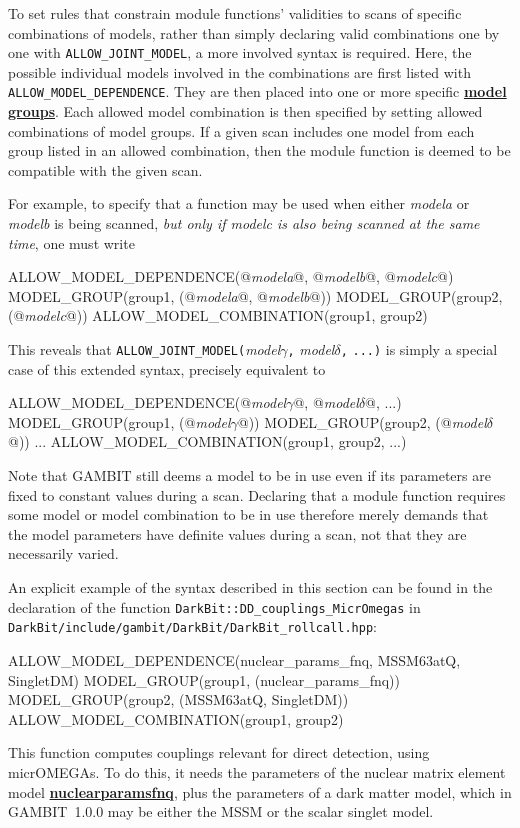 \documentclass[pdftex,twocolumn,epjc3_preprint,runningheads]{svjour3}
\renewcommand{\_}{\discretionary{\underscore}{}{\underscore}}
\newcommand\cpp[1]{{\lstinline!#1!}}  %
\newcommand\term[1]{{\lstset{style=terminal}\lstinline!#1!\lstset{style=cpp}}}
\newcommand{\doublecross}[2]{\hyperref[#2]{\textbf{#1}}}
\newcommand{\doublecrosssf}[2]{\hyperref[#2]{\textbf{\textsf{#1}}}}
\newcommand{\metavarf}[1]{\textit{\color{darkgreen}\footnotesize\textrm{#1}}}
\newcommand{\metavar}{\metavarf}
\newcommand{\gambit}{\textsf{GAMBIT}\xspace}
\newcommand{\GB}{\gambit}
\newcommand{\micromegas}{\textsf{micrOMEGAs}\xspace}
\begin{document}
To set rules that constrain module functions' validities to scans of specific combinations of models, rather than simply declaring valid combinations one by one with \lstinline|ALLOW_JOINT_MODEL|, a more involved syntax is required.  Here, the possible individual models involved in the combinations are first listed with \lstinline|ALLOW_MODEL_DEPENDENCE|.  They are then placed into one or more specific \doublecross{model groups}{model group}.  Each allowed model combination is then specified by setting allowed combinations of model groups.  If a given scan includes one model from each group listed in an allowed combination, then the module function is deemed to be compatible with the given scan.

For example, to specify that a function may be used when either \metavar{model\_a} or \metavar{model\_b} is being scanned, \textit{but only if \metavar{model\_c} is also being scanned at the same time}, one must write
\begin{lstcpp}
ALLOW_MODEL_DEPENDENCE(@\metavar{model\_a}@, @\metavar{model\_b}@, @\metavar{model\_c}@)
MODEL_GROUP(group1, (@\metavar{model\_a}@, @\metavar{model\_b}@))
MODEL_GROUP(group2, (@\metavar{model\_c}@))
ALLOW_MODEL_COMBINATION(group1, group2)
\end{lstcpp}
This reveals that \cpp{ALLOW_JOINT_MODEL(}\metavar{model\_$\gamma$}\cpp{,} \metavar{model\_$\delta$}\cpp{,} \cpp{...)} is simply a special case of this extended syntax, precisely equivalent to
\begin{lstcpp}
ALLOW_MODEL_DEPENDENCE(@\metavar{model\_$\gamma$}@, @\metavar{model\_$\delta$}@, ...)
MODEL_GROUP(group1, (@\metavar{model\_$\gamma$}@))
MODEL_GROUP(group2, (@\metavar{model\_$\delta$}@))
...
ALLOW_MODEL_COMBINATION(group1, group2, ...)
\end{lstcpp}

Note that \GB still deems a model to be in use even if its parameters are fixed to constant values during a scan.  Declaring that a module function requires some model or model combination to be in use therefore merely demands that the model parameters have definite values during a scan, not that they are necessarily varied.

An explicit example of the syntax described in this section can be found in the declaration of the function \cpp{DarkBit::DD_couplings_MicrOmegas} in \term{DarkBit/include/gambit/DarkBit/DarkBit_rollcall.hpp}:
\begin{lstcpp}
ALLOW_MODEL_DEPENDENCE(nuclear_params_fnq,
 MSSM63atQ, SingletDM)
MODEL_GROUP(group1, (nuclear_params_fnq))
MODEL_GROUP(group2, (MSSM63atQ, SingletDM))
ALLOW_MODEL_COMBINATION(group1, group2)
\end{lstcpp}
This function computes couplings relevant for direct detection, using \micromegas \cite{micromegas}.  To do this, it needs the parameters of the nuclear matrix element model \doublecrosssf{nuclear\_params\_fnq}{nuclear_params_fnq}, plus the parameters of a dark matter model, which in \GB\ \textsf{1.0.0} may be either the MSSM or the scalar singlet model.
\end{document}
